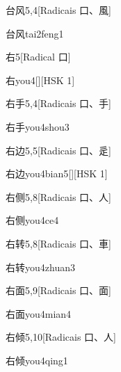 \begin{entry}{台风}{5,4}[Radicais ⼝、⾵]
  \begin{phonetics}{台风}{tai2feng1}
  \end{phonetics}
\end{entry}

\begin{entry}{右}{5}[Radical ⼝]
  \begin{phonetics}{右}{you4}[][HSK 1]
  \end{phonetics}
\end{entry}

\begin{entry}{右手}{5,4}[Radicais ⼝、⼿]
  \begin{phonetics}{右手}{you4shou3}
  \end{phonetics}
\end{entry}

\begin{entry}{右边}{5,5}[Radicais ⼝、⾡]
  \begin{phonetics}{右边}{you4bian5}[][HSK 1]
  \end{phonetics}
\end{entry}

\begin{entry}{右侧}{5,8}[Radicais ⼝、⼈]
  \begin{phonetics}{右侧}{you4ce4}
  \end{phonetics}
\end{entry}

\begin{entry}{右转}{5,8}[Radicais ⼝、⾞]
  \begin{phonetics}{右转}{you4zhuan3}
  \end{phonetics}
\end{entry}

\begin{entry}{右面}{5,9}[Radicais ⼝、⾯]
  \begin{phonetics}{右面}{you4mian4}
  \end{phonetics}
\end{entry}

\begin{entry}{右倾}{5,10}[Radicais ⼝、⼈]
  \begin{phonetics}{右倾}{you4qing1}
  \end{phonetics}
\end{entry}

